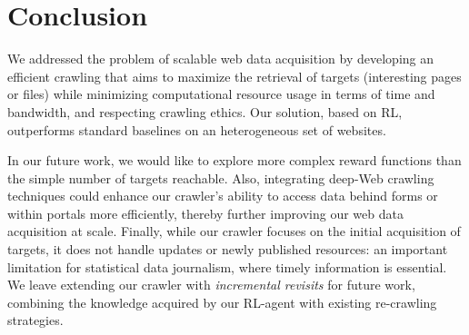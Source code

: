 \section{Conclusion}\label{section:conclusion}

We addressed the problem of scalable web data acquisition by developing an efficient crawling that aims to maximize the retrieval of targets (interesting pages or files) while minimizing computational resource usage in terms of time and bandwidth, and respecting crawling ethics. 
Our solution, based on RL, outperforms standard baselines on an heterogeneous set of websites.

In our future work, we would like to explore more complex reward functions than the simple number of targets reachable. 
Also, integrating deep-Web crawling techniques could enhance our crawler's ability to access data behind forms or within portals more efficiently, thereby further improving our web data acquisition at scale.
Finally, while our crawler focuses on the initial acquisition of
targets, it does not handle updates or newly published resources: an
important limitation for statistical data journalism, where timely
information is essential. We leave extending our crawler with
\emph{incremental revisits} for future work, combining the knowledge acquired by our RL-agent with existing re-crawling strategies.